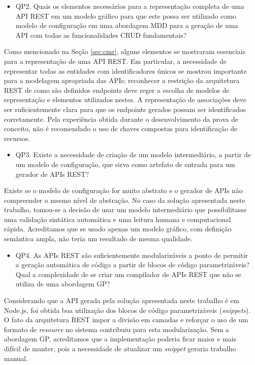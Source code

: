 \begin{itemize}
	\item QP2. Quais os elementos necessários para a representação completa de uma API REST em um modelo gráfico para que este possa ser utilizado como modelo de configuração em uma abordagem MDD para a geração de uma API com todas as funcionalidades CRUD fundamentais?
\end{itemize}

Como mencionado na Seção \ref{sec:cmr}, alguns elementos se mostraram essenciais para a representação de uma API REST. Em particular, a necessidade de representar todas as entidades com identificadores únicos se mostrou importante para a modelagem apropriada das APIs; reconhecer a restrição da arquitetura REST de como são definidos endpoints deve reger a escolha de modelos de representação e elementos utilizados nestes. A representação de associações deve ser suficientemente clara para que os endpoints gerados possam ser identificados corretamente. Pela experiência obtida durante o desenvolvimento da prova de conceito, não é recomendado o uso de chaves compostas para identificação de recursos.

\begin{itemize}
	\item QP3. Existe a necessidade de criação de um modelo intermediário, a partir de um modelo de configuração, que sirva como artefato de entrada para um gerador de APIs REST?
\end{itemize}

Existe se o modelo de configuração for muito abstrato e o gerador de APIs não compreender o mesmo nível de abstração. No caso da solução apresentada neste trabalho, tomou-se a decisão de usar um modelo intermediário que possibilitasse uma validação sintática automática e uma leitura humana e computacional rápida. Acreditamos que se usado apenas um modelo gráfico, com definição semântica ampla, não teria um resultado de mesma qualidade.

\begin{itemize}
	\item QP4. As APIs REST são suficientemente modularizáveis a ponto de permitir a geração automática de código a partir de blocos de código parametrizáveis? Qual a complexidade de se criar um compilador de APIs REST que não se utiliza de uma abordagem GP?
\end{itemize}

Considerando que a API gerada pela solução apresentada neste trabalho é em Node.js, foi obtida boa utilização dos blocos de código parametrizáveis (\textit{snippets}). O fato da arquitetura REST impor a divisão em camadas e reforçar o uso de um formato de \textit{resource} no sistema contribuiu para esta modularização. Sem a abordagem GP, acreditamos que a implementação poderia ficar maior e mais difícil de manter, pois a necessidade de atualizar um \textit{snippet} geraria trabalho manual.

